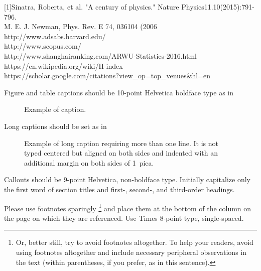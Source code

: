 \documentclass[times, 10pt,twocolumn]{article}
\begin{document}
 [1]Sinatra, Roberta, et al. "A century of physics." Nature Physics11.10(2015):791-796.\\
 [2]M. E. J. Newman, Phys. Rev. E 74, 036104 (2006\\
 [3]http://www.adsabs.harvard.edu/\\
 [4]http://www.scopus.com/\\
 [5] http://www.shanghairanking.com/ARWU-Statistics-2016.html\\
 [6] https://en.wikipedia.org/wiki/H-index\\
 [7]https://scholar.google.com/citations?view_op=top_venues&hl=en\\


Figure and table captions should be 10-point 
Helvetica boldface type as in
\begin{figure}[h]
   \caption{Example of caption.}
\end{figure}

\noindent Long captions should be set as in 
\begin{figure}[h] 
   \caption{Example of long caption requiring more than one line. It is 
     not typed centered but aligned on both sides and indented with an 
     additional margin on both sides of 1~pica.}
\end{figure}

\noindent Callouts should be 9-point Helvetica, non-boldface type. 
Initially capitalize only the first word of section titles and first-, 
second-, and third-order headings.


Please use footnotes sparingly%
\footnote
   {%
     Or, better still, try to avoid footnotes altogether.  To help your 
     readers, avoid using footnotes altogether and include necessary 
     peripheral observations in the text (within parentheses, if you 
     prefer, as in this sentence).
   }
and place them at the bottom of the column on the page on which they are 
referenced. Use Times 8-point type, single-spaced.


\nocite{ex1,ex2}


\end{document}
